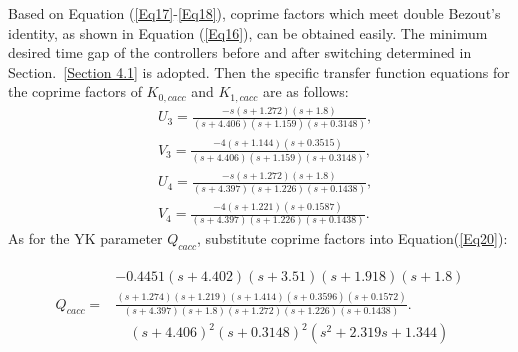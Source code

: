 \documentclass[journal]{IEEEtran}
\begin{document}
Based on Equation (\ref{Eq17}-\ref{Eq18}), coprime factors which meet double Bezout's identity, as shown in Equation (\ref{Eq16}), can be obtained easily. The minimum desired time gap of the controllers before and after switching determined in Section.~\ref{Section 4.1} is adopted. Then the specific transfer function equations for the coprime factors of $K_{0,cacc}$ and $K_{1,cacc}$ are as follows:
\begin{equation}
  \begin{aligned}
     & U_{3}=\frac{-s(s+1.272)(s+1.8)}{(s+4.406)(s+1.159)(s+0.3148)},    \\
     & V_{3}=\frac{-4(s+1.144)(s+0.3515)}{(s+4.406)(s+1.159)(s+0.3148)}, \\
     & U_{4}=\frac{-s(s+1.272)(s+1.8)}{(s+4.397)(s+1.226)(s+0.1438)},    \\
     & V_{4}=\frac{-4(s+1.221)(s+0.1587)}{(s+4.397)(s+1.226)(s+0.1438)}.
  \end{aligned}
\end{equation}
As for the YK parameter $Q_{cacc}$, substitute coprime factors into Equation(\ref{Eq20}):
\begin{small}
  \begin{equation}
    \begin{gathered}
      \begin{aligned}
                     & -0.4451(s+4.402)(s+3.51)(s+1.918)(s+1.8)                                                              \\
        Q_{c a c c}= & \frac{(s+1.274)(s+1.219)(s+1.414)(s+0.3596)(s+0.1572)}{(s+4.397)(s+1.8)(s+1.272)(s+1.226)(s+0.1438)}. \\
                     & \quad (s+4.406)^{2}(s+0.3148)^{2}\left(s^{2}+2.319 s+1.344\right)
      \end{aligned}
    \end{gathered}
  \end{equation}
\end{small}
\end{document}
